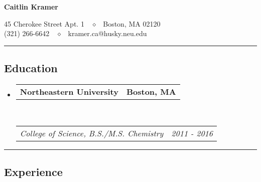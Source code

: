 \documentclass[10pt,letterpaper]{article}
\makeatletter
\newcommand{\headerrow}[2]
{\begin{tabular*}{\linewidth}{l@{\extracolsep{\fill}}r}
  #1 &
  #2 \\
\end{tabular*}}
\makeatother
\begin{document}
\begin{center}
{\LARGE \textbf{Caitlin Kramer}}

45 Cherokee Street Apt. 1\ \ $\diamond$
\ Boston, MA 02120
\\
(321) 266-6642\ \ $\diamond$
\ kramer.ca@husky.neu.edu
\end{center}


\hrule
\vspace{-0.4em}
\subsection*{Education}

\begin{itemize}
  \parskip=0.1em

  \item
  \headerrow
      {\textbf{Northeastern University}}
      {\textbf{Boston, MA}}
  \\
  \headerrow
      {\emph{College of Science, B.S./M.S. Chemistry}}
      {\emph{2011 - 2016}}

\end{itemize}

\hrule
\vspace{-0.4em}
\subsection*{Experience}
\end{document}
